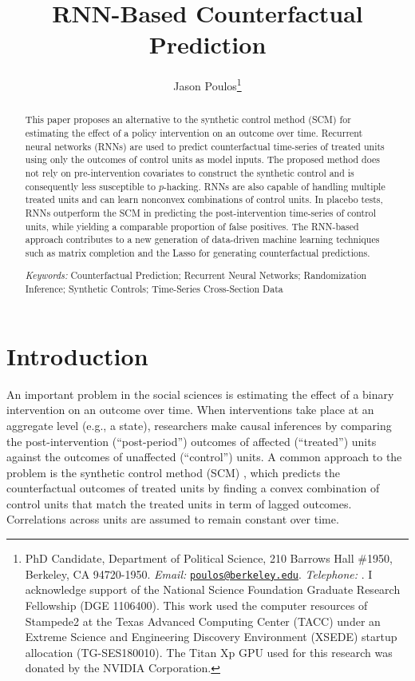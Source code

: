 \documentclass[hidelinks,12pt]{article}
\title{RNN-Based Counterfactual Prediction}
\author[ ]{Jason Poulos\thanks{PhD Candidate, Department of Political Science, 210 Barrows Hall \#1950, Berkeley, CA 94720-1950. \emph{Email:} \href{mailto:poulos@berkeley.edu}{\nolinkurl{poulos@berkeley.edu}}. \emph{Telephone:} \Plus 1\Minus 510\Minus 642\Minus 6323. I acknowledge support of the National Science Foundation Graduate Research Fellowship (DGE 1106400). This work used the computer resources of Stampede2 at the Texas Advanced Computing Center (TACC) under an Extreme Science and Engineering Discovery Environment (XSEDE) startup allocation (TG-SES180010). The Titan Xp GPU used for this research was donated by the NVIDIA Corporation.}}
\affil[ ]{University of California, Berkeley}
\date{}
\begin{document}
 
 
\begin{singlespacing}
\maketitle  
\end{singlespacing}
\thispagestyle{empty}

\begin{abstract}  %
\noindent 
This paper proposes an alternative to the synthetic control method (SCM) for estimating the effect of a policy intervention on an outcome over time. Recurrent neural networks (RNNs) are used to predict counterfactual time-series of treated units using only the outcomes of control units as model inputs. The proposed method does not rely on pre-intervention covariates to construct the synthetic control and is consequently less susceptible to $p$-hacking. RNNs are also capable of handling multiple treated units and can learn nonconvex combinations of control units. In placebo tests, RNNs outperform the SCM in predicting the post-intervention time-series of control units, while yielding a comparable proportion of false positives. The RNN-based approach contributes to a new generation of data-driven machine learning techniques such as matrix completion and the Lasso for generating counterfactual predictions.
\\
\begin{singlespace}
	\emph{Keywords:} Counterfactual Prediction; Recurrent Neural Networks; Randomization Inference; Synthetic Controls; Time-Series Cross-Section Data
\end{singlespace}
\end{abstract}

\pagebreak
{}%

\section{Introduction} 

An important problem in the social sciences is estimating the effect of a binary intervention on an outcome over time. When interventions take place at an aggregate level (e.g., a state), researchers make causal inferences by comparing the post-intervention (``post-period'') outcomes of affected (``treated'') units against the outcomes of unaffected  (``control'') units. A common approach to the problem is the synthetic control method (SCM) \citep{abadie2010synthetic}, which predicts the counterfactual outcomes of treated units by finding a convex combination of control units that match the treated units in term of lagged outcomes. Correlations across units are assumed to remain constant over time. 
\end{document}
